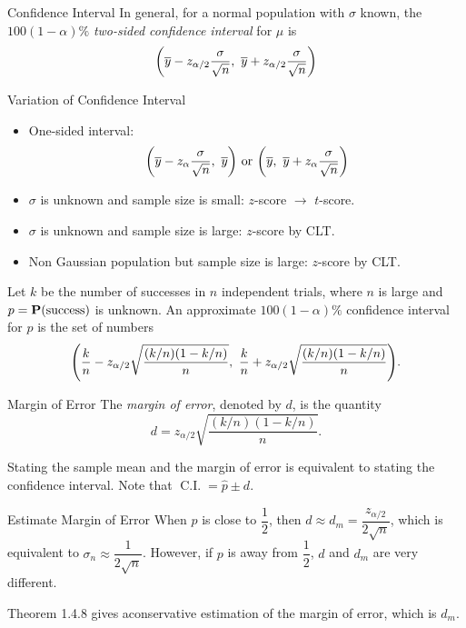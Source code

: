 \begin{thm}{Confidence Interval}
	In general, for a normal population with $\sigma$ known, the $100(1-\alpha)\%$ \textit{two-sided confidence interval} for $\mu$ is \[\qty(\bar{y}-z_{\alpha/2}\dfrac{\sigma}{\sqrt{n}},\ \bar{y}+z_{\alpha/2}\dfrac{\sigma}{\sqrt{n}})\]
\end{thm}
\begin{thm}{Variation of Confidence Interval}
	\begin{itemize}
		\item One-sided interval: \[\qty(\bar{y}-z_{\alpha}\dfrac{\sigma}{\sqrt{n}},\ \bar{y})\text{ or }\qty(\bar{y},\ \bar{y}+z_{\alpha}\dfrac{\sigma}{\sqrt{n}})\]
		\item $\sigma$ is unknown and sample size is small: $z$-score $\to$ $t$-score.
		\item $\sigma$ is unknown and sample size is large: $z$-score by CLT.
		\item Non Gaussian population but sample size is large: $z$-score by CLT. 
	\end{itemize}	
\end{thm}
\begin{thm}{}
	Let $k$ be the number of successes in $n$ independent trials, where $n$ is large and $p=\P(\text{success})$ is unknown. An approximate $100(1-\alpha)\%$ confidence interval for $p$ is the set of numbers \[\qty(\dfrac{k}{n}-z_{\alpha/2}\sqrt{\dfrac{(k/n)(1-k/n)}{n}},\ \dfrac{k}{n}+z_{\alpha/2}\sqrt{\dfrac{(k/n)(1-k/n)}{n}}).\]
\end{thm}
\begin{df}{Margin of Error}
	The \textit{margin of error}, denoted by $d$, is the quantity\[d=z_{\alpha/2}\sqrt{\dfrac{(k/n)(1-k/n)}{n}}.\]	
\end{df}
\begin{rmk}
	Stating the sample mean and the margin of error is equivalent to stating the confidence interval. Note that $\operatorname{C.I.}=\hat p\pm d$.	
\end{rmk}
\begin{thm}{Estimate Margin of Error}
	When $p$ is close to $\dfrac{1}{2}$, then $d\approx d_m=\dfrac{z_{\alpha/2}}{2\sqrt{n}}$, which is 	equivalent to $\sigma_n\approx\dfrac{1}{2\sqrt{n}}$. However, if $p$ is away from $\dfrac{1}{2}$, $d$ and $d_m$ are very different.
\end{thm}
\begin{rmk}
	Theorem 1.4.8 gives aconservative estimation of the margin of error, which is $d_m$.	
\end{rmk}
